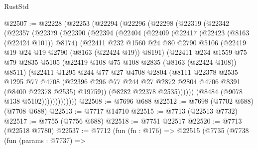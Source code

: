 \begin{lexlean}{RustStd}
\begin{coremodule}
@22507 := @22228
    (@22253
      (@22294
        (@22296
          (@22298
            (@22319
              (@22342
                (@22357
                  (@22379
                    (@22390
                      (@22394
                        (@22404
                          (@22409
                            (@22417
                              (@22423 (@8163 (@22424 @101)) @8174)
                              (@22411
                                @232
                                @1560
                                @24
                                @80
                                @2790
                                @5106
                                (@22419 @19 @24 @19 @2790 (@8163 (@22424 @19)) @8191)
                                (@22411
                                  @234
                                  @1559
                                  @75
                                  @79
                                  @2835
                                  @5105
                                  (@22419 @108 @75 @108 @2835 (@8163 (@22424 @108)) @8511)
                                  (@22411
                                    @1295
                                    @244
                                    @77
                                    @27
                                    @4708
                                    @2804
                                    (@8111
                                      @22378
                                      @2535
                                      @1295
                                      @77
                                      @4708
                                      (@22396
                                        @296
                                        @77
                                        @244
                                        @27
                                        @2872
                                        @2804
                                        @4706
                                        @8391
                                        (@8400 @22378 @2535)
                                        @19759))
                                    (@8282 @22378 @2535))))))
                          (@8484 (@9078 @138 @5102)))))))))))))
@22508 := @7696 @688
@22512 := @7698 (@7702 @688) (@7708 @688)
@22513 := @7717 @14710
@22515 := @7713 (@22513 @7732)
@22517 := @7755 (@7756 @688)
@22518 := @7751 @22517
@22520 := @7713 (@22518 @7780)
@22537 := @7712
    (fun (fn : @176) =>
    @22515
      (@7735
        (@7738
          (fun (params : @7737) =>

\end{coremodule}
\end{lexlean}
